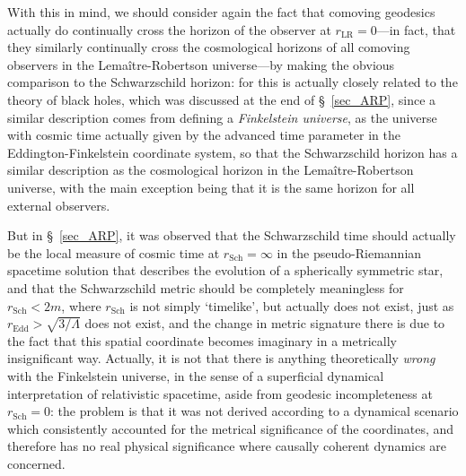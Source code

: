 With this in mind, we should consider again the fact that comoving geodesics actually do continually cross the horizon of the observer at $r_{\mathrm{LR}}=0$---in fact, that they similarly continually cross the cosmological horizons of all comoving observers in the Lema\^{i}tre-Robertson universe---by making the obvious comparison to the Schwarzschild horizon: for this is actually closely related to the theory of black holes, which was discussed at the end of \S~\ref{sec_ARP}, since a similar description comes from defining a \textit{Finkelstein universe}, as the universe with cosmic time actually given by the advanced time parameter in the Eddington-Finkelstein coordinate system, so that the Schwarzschild horizon has a similar description as the cosmological horizon in the Lema\^{i}tre-Robertson universe, with the main exception being that it is the same horizon for all external observers.

But in \S~\ref{sec_ARP}, it was observed that the Schwarzschild time should actually be the local measure of cosmic time at $r_{\mathrm{Sch}}=\infty$ in the pseudo-Riemannian spacetime solution that describes the evolution of a spherically symmetric star, and that the Schwarzschild metric should be completely meaningless for $r_{\mathrm{Sch}}<2m$, where $r_{\mathrm{Sch}}$ is not simply `timelike', but actually does not exist, just as $r_{\mathrm{Edd}}>\sqrt{3/\Lambda}$ does not exist, and the change in metric signature there is due to the fact that this spatial coordinate becomes imaginary in a metrically insignificant way. Actually, it is not that there is anything theoretically \textit{wrong} with the Finkelstein universe, in the sense of a superficial dynamical interpretation of relativistic spacetime, aside from geodesic incompleteness at $r_{\mathrm{Sch}}=0$: the problem is that it was not derived according to a dynamical scenario which consistently accounted for the metrical significance of the coordinates, and therefore has no real physical significance where causally coherent dynamics are concerned.

